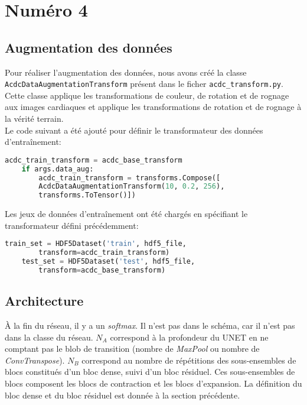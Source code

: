 \pagebreak
\section{Numéro 4}
\subsection{Augmentation des données}
    Pour réaliser l'augmentation des données, nous avons créé la classe \texttt{AcdcDataAugmentationTransform} présent dans le ficher \texttt{acdc\_transform.py}. Cette classe applique les transformations de couleur, de rotation et de rognage aux images cardiaques et applique les transformations de rotation et de rognage à la vérité terrain.\\
    
    Le code suivant a été ajouté pour définir le transformateur des données d'entraînement: \\
    
    \begin{lstlisting}[language=python]
    acdc_train_transform = acdc_base_transform
    if args.data_aug:    
        acdc_train_transform = transforms.Compose([
        AcdcDataAugmentationTransform(10, 0.2, 256),
        transforms.ToTensor()])
    \end{lstlisting}
    
    Les jeux de données d'entraînement ont été chargés en spécifiant le transformateur défini précédemment:    
    \begin{lstlisting}[language=python]
    train_set = HDF5Dataset('train', hdf5_file,
        transform=acdc_train_transform)
    test_set = HDF5Dataset('test', hdf5_file,
        transform=acdc_base_transform)    
    \end{lstlisting}

\begin{landscape}
    \subsection{Architecture}
        À la fin du réseau, il y a un \textit{softmax}. Il n'est pas dans le schéma, car il n'est pas dans la classe du réseau. \(N_A\) correspond à la profondeur du UNET en ne comptant pas le blob de transition (nombre de \textit{MaxPool} ou nombre de \textit{ConvTranspose}). \(N_B\) correspond au nombre de répétitions des sous-ensembles de blocs constitués d'un bloc dense, suivi d'un bloc résiduel. Ces sous-ensembles de blocs composent les blocs de contraction et les blocs d'expansion. La définition du bloc dense et du bloc résiduel est donnée à la section précédente.
        \begin{figure}[H]
            \centering 
            \caption{ }
        \end{figure}
\end{landscape}

